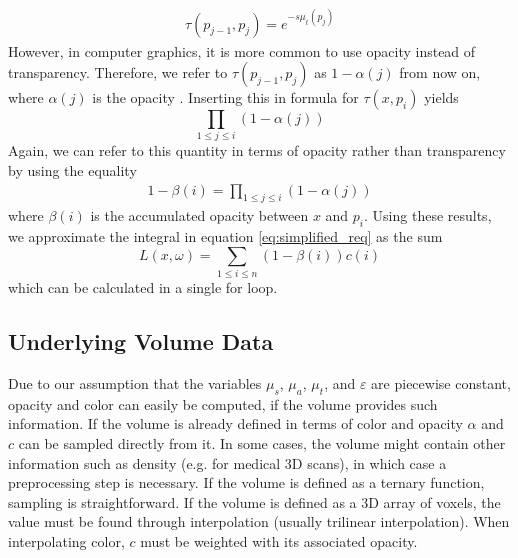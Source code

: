 \begin{align*}
\tau(p_{j-1}, p_j) = e^{-s\mu_t(p_j)}
\end{align*}
However, in computer graphics, it is more common to use opacity instead of transparency. Therefore, we refer to $\tau(p_{j-1}, p_j)$ as $1 - \alpha(j)$ from now on, where $\alpha(j)$ is the opacity \cite{10.1145/147130.147155}. Inserting this in formula for $\tau({x}, p_i)$ yields 
\begin{equation} \label{eq:discrete_transmittance}
\prod_{1 \le j \le i} (1 - \alpha(j))
\end{equation}
Again, we can refer to this quantity in terms of opacity rather than transparency by using the equality
\begin{align*}
1 - \beta(i) = \prod_{1 \le j \le i} (1 - \alpha(j))
\end{align*}
where $\beta(i)$ is the accumulated opacity \cite{10.1145/147130.147155} between ${x}$ and $p_i$.
Using these results, we approximate the integral in equation \ref{eq:simplified_req} as the sum
\begin{equation} \label{eq:discrete_approximation}
L({x},\omega) = \sum_{1 \le i \le n}(1 - \beta(i))c(i)
\end{equation}
which can be calculated in a single for loop\cite{10.1145/147130.147155}.


\subsection{Underlying Volume Data}
Due to our assumption that the variables $\mu_s$, $\mu_a$, $\mu_t$, and $\varepsilon$ are piecewise constant, opacity and color can easily be computed, if the volume provides such information. If the volume is already defined in terms of color and opacity $\alpha$ and $c$ can be sampled directly from it.
In some cases, the volume might contain other information such as density (e.g. for medical 3D scans), in which case a preprocessing step\cite{511} is necessary.
If the volume is defined as a ternary function, sampling is straightforward. If the volume is defined as a 3D array of voxels, the value must be found through interpolation (usually trilinear interpolation\cite{511}).
When interpolating color, $c$ must be weighted with its associated opacity\cite{729595}.

